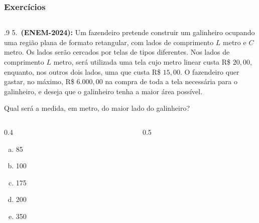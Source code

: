 \documentclass[aspectratio=169, t, 8pt]{beamer}
\begin{document}
    \begin{frame}
        \frametitle{Exercícios}
        \begin{columns}
            \begin{column}{.9\textwidth}
                5.~\textbf{(ENEM-2024): }Um fazendeiro pretende construir um galinheiro ocupando uma região plana de formato retangular, com lados de comprimento $L$ metro e $C$ metro. Os lados serão cercados por telas de tipos diferentes. Nos lados de comprimento $L$ metro, será utilizada uma tela cujo metro linear custa R\$ $20,00$, enquanto, nos outros dois lados, uma que custa R\$ $15,00$. O fazendeiro quer gastar, no máximo, R\$ $6.000,00$ na compra de toda a tela necessária para o galinheiro, e deseja que o galinheiro tenha a maior área possível.

                Qual será a medida, em metro, do maior lado do galinheiro?

                \begin{columns}
                    \begin{column}{0.4\textwidth}
                         
                        \begin{enumerate}[a.]
                            \item 85
                            \item 100
                            \item 175
                            \item 200
                            \item 350
                        \end{enumerate}
                    \end{column}
                    \begin{column}{0.5\textwidth}
                        
                    \end{column}
                \end{columns}
            \end{column}
        \end{columns}
    \end{frame}
\end{document}

